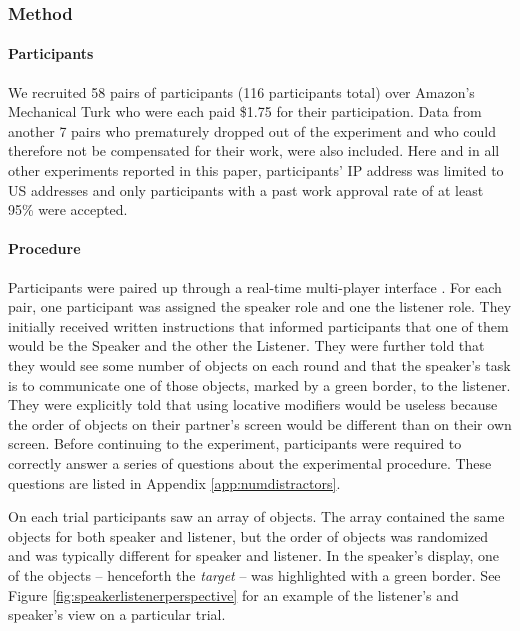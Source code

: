 \documentclass[11pt]{article}
\newcommand{\figref}[1]{Figure \ref{#1}}
\newcommand{\appref}[1]{Appendix \ref{#1}}
\begin{document}
\subsubsection{Method}

\paragraph{Participants}

We recruited 58 pairs of participants (116 participants total) over Amazon's Mechanical Turk who were each paid \$1.75 for their participation. Data from another 7 pairs who prematurely dropped out of the experiment and who could therefore not be compensated for their work, were also included. Here and in all other experiments reported in this paper, participants' IP address was limited to US addresses and only participants with a past work approval rate of at least 95\% were accepted. 

\paragraph{Procedure}

Participants were paired up through a real-time multi-player interface \cite{Hawkins15_RealTimeWebExperiments}. For each pair, one participant was assigned the speaker role and one the listener role. They  initially received written instructions that informed participants that one of them would be the Speaker and the other the Listener. They were further told that they would see some number of objects on each round and that the speaker's task is to communicate one of those objects, marked by a green border, to the listener. They were explicitly told that using locative modifiers would be useless because the order of objects on their partner's screen would be different than on their own screen. Before continuing to the experiment, participants were required to correctly answer a series of questions about the experimental procedure. These questions are listed in \appref{app:numdistractors}.

On each trial participants saw an array of objects. The array contained the same objects for both speaker and listener, but the order of objects was randomized and was typically different for speaker and listener. In the speaker's display, one of the objects -- henceforth the \emph{target} -- was highlighted with a green border. See \figref{fig:speakerlistenerperspective} for an example of the listener's and speaker's view on a particular trial.
\end{document}

